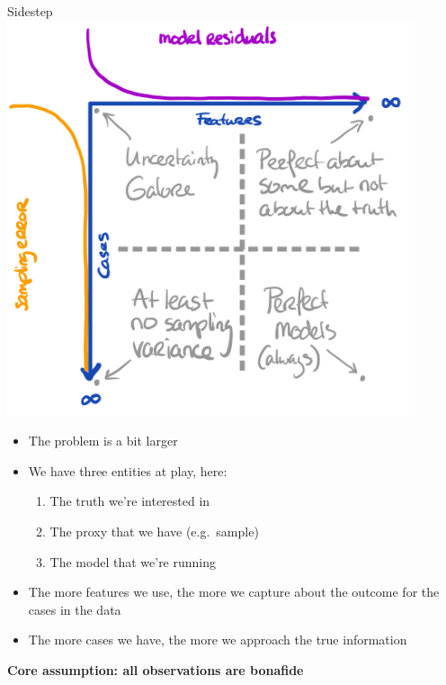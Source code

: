 \documentclass[
  ignorenonframetext,
]{beamer}
\providecommand{\tightlist}{%
  \setlength{\itemsep}{0pt}\setlength{\parskip}{0pt}}\usepackage{longtable,booktabs,array}
\begin{document}
\begin{frame}{Sidestep}
\protect\hypertarget{sidestep-1}{}
\includegraphics[width=0.9\textwidth,height=\textheight]{img/5. sidestep2.png}

\begin{itemize}
\item
  The problem is a bit larger
\item
  We have three entities at play, here:

  \begin{enumerate}
  \tightlist
  \item
    The truth we're interested in
  \item
    The proxy that we have (e.g.~sample)
  \item
    The model that we're running
  \end{enumerate}
\item
  The more features we use, the more we capture about the outcome for
  the cases in the data
\item
  The more cases we have, the more we approach the true information
\end{itemize}

\textbf{Core assumption: all observations are bonafide}
\end{frame}
\end{document}
